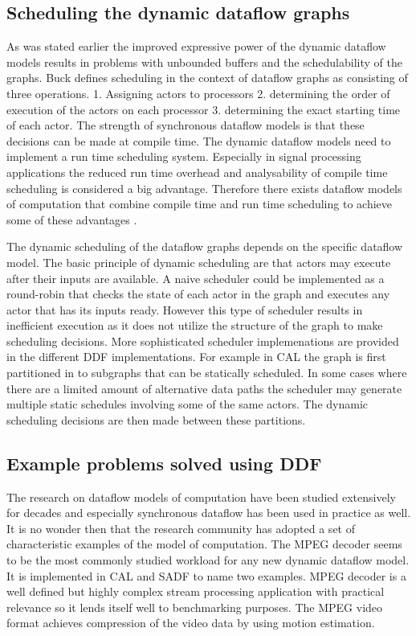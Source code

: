 \documentclass[conference,a4paper]{IEEEtran}
\begin{document}
\subsection{Scheduling the dynamic dataflow graphs}
As was stated earlier the improved expressive power of the dynamic dataflow
models results in problems with unbounded buffers and the schedulability of the
graphs. Buck \cite{buck1993scheduling} defines scheduling in the context of
dataflow graphs as consisting of three operations. 1. Assigning actors to
processors 2. determining the order of execution of the actors on each processor
3. determining the exact starting time of each actor. The strength of
synchronous dataflow models is that these decisions can be made at compile time.
The dynamic dataflow models need to implement a run time scheduling system.
Especially in signal processing applications the reduced run time overhead and
analysability of compile time scheduling is considered a big advantage.
Therefore there exists dataflow models of computation that combine compile time
and run time scheduling to achieve some of these advantages
\cite{buck1993scheduling, bhattacharyya2013handbook}.

The dynamic scheduling of the dataflow graphs depends on the specific dataflow
model. The basic principle of dynamic scheduling are that actors may execute
after their inputs are available. A naive scheduler could be implemented as a
round-robin that checks the state of each actor in the graph and executes any
actor that has its inputs ready. However this type of scheduler results in
inefficient execution as it does not utilize the structure of the graph to make
scheduling decisions. More sophisticated scheduler implemenations are provided
in the different DDF implementations. For example in CAL the graph is first
partitioned in to subgraphs that can be statically scheduled. In some cases
where there are a limited amount of alternative data paths the scheduler may
generate multiple static schedules involving some of the same actors. The
dynamic scheduling decisions are then made between these partitions.
\cite{eker2003cal}

\subsection{Example problems solved using DDF}
The research on dataflow models of computation have been studied extensively for
decades and especially synchronous dataflow has been used in practice as well.
It is no wonder then that the research community has adopted a set of
characteristic examples of the model of computation. The MPEG decoder seems to
be the most commonly studied workload for any new dynamic dataflow model. It is
implemented in CAL \cite{eker2003cal} and SADF \cite{bhattacharyya2013handbook}
to name two examples. MPEG decoder is a well defined but highly complex stream
processing application with practical relevance so it lends itself well to
benchmarking purposes. The MPEG video format achieves compression of the video
data by using motion estimation.
\end{document}
